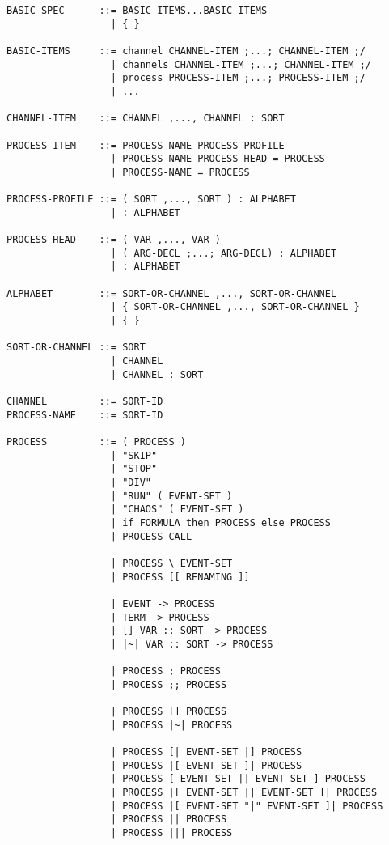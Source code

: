 \begin{verbatim}
BASIC-SPEC      ::= BASIC-ITEMS...BASIC-ITEMS
                  | { }

BASIC-ITEMS     ::= channel CHANNEL-ITEM ;...; CHANNEL-ITEM ;/
                  | channels CHANNEL-ITEM ;...; CHANNEL-ITEM ;/
                  | process PROCESS-ITEM ;...; PROCESS-ITEM ;/
                  | ...

CHANNEL-ITEM    ::= CHANNEL ,..., CHANNEL : SORT

PROCESS-ITEM    ::= PROCESS-NAME PROCESS-PROFILE
                  | PROCESS-NAME PROCESS-HEAD = PROCESS
                  | PROCESS-NAME = PROCESS

PROCESS-PROFILE ::= ( SORT ,..., SORT ) : ALPHABET
                  | : ALPHABET

PROCESS-HEAD    ::= ( VAR ,..., VAR )
                  | ( ARG-DECL ;...; ARG-DECL) : ALPHABET
                  | : ALPHABET

ALPHABET        ::= SORT-OR-CHANNEL ,..., SORT-OR-CHANNEL
                  | { SORT-OR-CHANNEL ,..., SORT-OR-CHANNEL }
                  | { }

SORT-OR-CHANNEL ::= SORT
                  | CHANNEL
                  | CHANNEL : SORT

CHANNEL         ::= SORT-ID
PROCESS-NAME    ::= SORT-ID

PROCESS         ::= ( PROCESS )
                  | "SKIP"
                  | "STOP"
                  | "DIV"
                  | "RUN" ( EVENT-SET )
                  | "CHAOS" ( EVENT-SET )
                  | if FORMULA then PROCESS else PROCESS
                  | PROCESS-CALL

                  | PROCESS \ EVENT-SET
                  | PROCESS [[ RENAMING ]]

                  | EVENT -> PROCESS
                  | TERM -> PROCESS
                  | [] VAR :: SORT -> PROCESS
                  | |~| VAR :: SORT -> PROCESS

                  | PROCESS ; PROCESS
                  | PROCESS ;; PROCESS

                  | PROCESS [] PROCESS
                  | PROCESS |~| PROCESS

                  | PROCESS [| EVENT-SET |] PROCESS
                  | PROCESS |[ EVENT-SET ]| PROCESS
                  | PROCESS [ EVENT-SET || EVENT-SET ] PROCESS
                  | PROCESS |[ EVENT-SET || EVENT-SET ]| PROCESS
                  | PROCESS |[ EVENT-SET "|" EVENT-SET ]| PROCESS
                  | PROCESS || PROCESS
                  | PROCESS ||| PROCESS


\end{verbatim}
